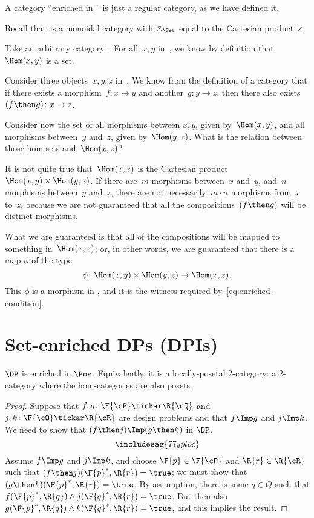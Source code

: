 \begin{example}
A category ``enriched in \Set'' is just a regular category, as we have defined it.

Recall that~\Set is a monoidal category with $\otimes_{\Set}$ equal to the Cartesian product $\times$.

Take an arbitrary category~\CatC. For all~$x, y$ in~\CatC, we know by definition
that~$\Hom(x,y)$ is a set.

Consider three objects~$x,y,z$ in~\CatC. We know from the definition of a
category that if there exists a morphism~$f: x \to y$ and another~$g: y \to z$,
then there also exists~$(f\then g)\colon x \to z$.

Consider now the set of all morphisms between $x, y$, given by~$\Hom(x,y)$, and
all morphisms between~$y$ and~$z$, given by~$\Hom(y, z)$. What is the relation
between those hom-sets and~$\Hom(x, z)$?

It is not quite true that~$\Hom(x, z)$ is the Cartesian product~$\Hom(x, y)
\times \Hom(y, z)$. If there are~$m$ morphisms between~$x$ and~$y$, and~$n$
morphisms between~$y$ and~$z$, there are not necessarily~$m \cdot n$ morphisms
from~$x$ to~$z$, because we are not guaranteed that all the compositions~$(f\then g)$
will be distinct morphisms.

What we are guaranteed is that all of the compositions will be mapped to something in~$\Hom(x, z)$; or, in other words, we are guaranteed that there
is a map $\phi$ of the type
\begin{equation}
    \phi \colon \Hom(x, y) \times \Hom(y, z) \rightarrow \Hom(x, z).
\end{equation}
This $\phi$ is a morphism in \Set, and it is the witness required by~\eqref{eq:enriched-condition}.

\end{example}


\clearpage 

\section{Set-enriched DPs (DPIs)}

\begin{proposition}\label{prop:DP_loc_pos}
$\DP$ is enriched in $\Pos$. Equivalently, it is a locally-posetal 2-category: a 2-category where the hom-categories are also posets.
\end{proposition}
\begin{proof}
Suppose that $f,g\colon \F{\cP} \tickar \R{\cQ}$ and $j,k\colon \F{\cQ} \tickar \R{\cR}$ are design problems and that $f\Imp g$ and $j\Imp k$. We need to show that $(f\then j)\Imp(g\then k)$ in $\DP$.
\begin{equation}
\includesag{77_dploc}
\end{equation}
Assume $f\Imp g$ and $j\Imp k$, and choose $\F{p}\in\F{\cP} $ and $\R{r}\in\R{\cR}$ such that $(f\then j)(\F{p}^*,\R{r})=\true$; we must show that $(g \then k)(\F{p}^*,\R{r})=\true$. By assumption, there is some $q\in Q$ such that $f(\F{p}^*,\R{q})\wedge j(\F{q}^*,\R{r})=\true$. But then also $g(\F{p}^*,\R{q})\wedge k(\F{q}^*,\R{r})=\true$, and this implies the result.
\end{proof}


